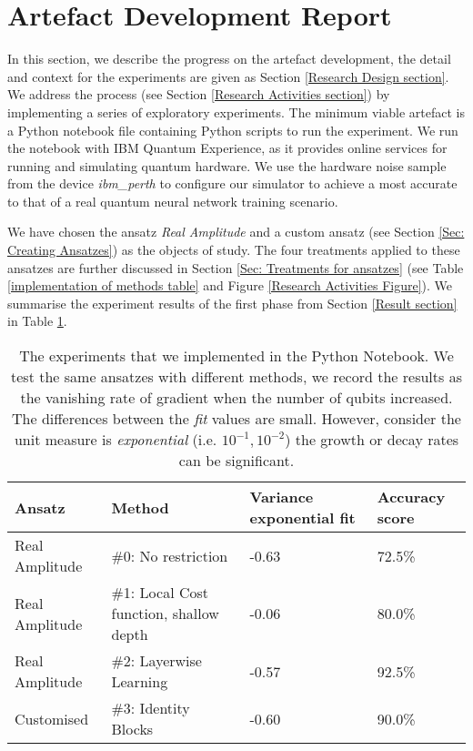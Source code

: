 \section{Artefact Development Report}
\label{Minimum Artefact section}
In this section, we describe the progress on the artefact development, the detail and context for the experiments are given as Section \ref{Research Design section}.
We address the process (see Section \ref{Research Activities section}) by implementing a series of exploratory experiments.
The minimum viable artefact is a Python notebook file containing Python scripts to run the experiment.
We run the notebook with IBM Quantum Experience, as it provides online services for running and simulating quantum hardware.
We use the hardware noise sample from the device \emph{ibm\_perth} to configure our simulator to achieve a most accurate to that of a real quantum neural network training scenario.

We have chosen the ansatz \emph{Real Amplitude} and a custom ansatz (see Section \ref{Sec: Creating Ansatzes}) as the objects of study.
The four treatments applied to these ansatzes are further discussed in Section \ref{Sec: Treatments for ansatzes} (see Table \ref{implementation of methods table} and Figure \ref{Research Activities Figure}).
We summarise the experiment results of the first phase from Section \ref{Result section} in Table \ref{Experiment summary table}.

\begin{table}
    \centering
    \begin{tabular}{|| l l p{2.2cm} p{1.7cm} ||}
        \hline
        \textbf{Ansatz} & \textbf{Method}                         & \textbf{Variance exponential fit} & \textbf{Accuracy score} \\[0.5ex]
        \hline \hline
        Real Amplitude  & \#0: No restriction                     & -0.63                             & 72.5\%                  \\
        \hline
        Real Amplitude  & \#1: Local Cost function, shallow depth & -0.06                             & 80.0\%                  \\
        \hline
        Real Amplitude  & \#2: Layerwise Learning                 & -0.57                             & 92.5\%                  \\
        \hline
        Customised      & \#3: Identity Blocks                    & -0.60                             & 90.0\%                  \\
        \hline
    \end{tabular}
    \caption{
        The experiments that we implemented in the Python Notebook. We test the same ansatzes with different methods, we record the results as the vanishing rate of gradient when the number of qubits increased.
        The differences between the \emph{fit} values are small.
        However, consider the unit measure is \emph{exponential} (i.e. $10^{-1}, 10^{-2}$) the growth or decay rates can be significant.
    }
    \label{Experiment summary table}
\end{table}

